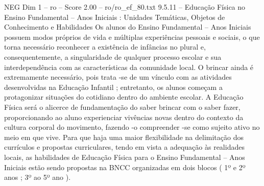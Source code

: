 \begin{textsample}{NEG Dim 1 – ro – Score 2.00 – ro/ro\_ef\_80.txt}  \label{ex:f1_neg_158}
9.5.11 – Educação Física no Ensino Fundamental – Anos Iniciais : Unidades Temáticas, Objetos de Conhecimento e Habilidades Os alunos do Ensino Fundamental – Anos Iniciais possuem modos próprios de vida e múltiplas experiências pessoais e sociais, o que torna necessário reconhecer a existência de infâncias no plural e, consequentemente, a singularidade de qualquer processo escolar e sua interdependência com as características da comunidade local.
O brincar ainda é extremamente necessário, pois trata -se de um vínculo com as atividades desenvolvidas na Educação Infantil ; entretanto, os alunos começam a protagonizar situações do cotidiano dentro do ambiente escolar.
A Educação Física será o alicerce de fundamentação do saber brincar com o saber fazer, proporcionando ao aluno experienciar vivências novas dentro do contexto da cultura corporal do movimento, fazendo -o compreender -se como sujeito ativo no meio em que vive.
Para que haja uma maior flexibilidade na delimitação dos currículos e propostas curriculares, tendo em vista a adequação às realidades locais, as habilidades de Educação Física para o Ensino Fundamental – Anos Iniciais estão sendo propostas na BNCC organizadas em dois blocos ( 1º e 2º anos ; 3º ao 5º ano ).

\end{textsample}
